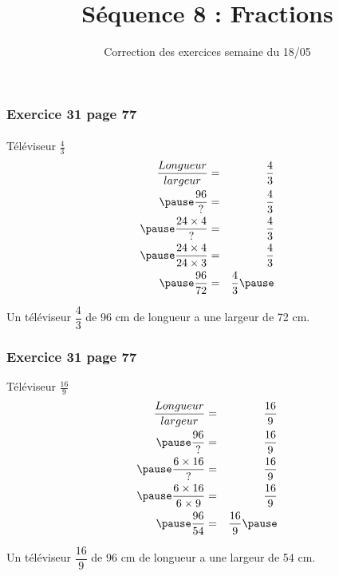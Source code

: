 \documentclass[xcolor={dvipsnames}]{beamer}
\title{Séquence 8 : Fractions}
\subtitle{Correction des exercices semaine du 18/05}
\begin{document}
\begin{frame}
  \titlepage 
\end{frame}

	

\begin{frame}
	\frametitle{Exercice 31 page 77}
	\framesubtitle{}
	

	
	\begin{block}{{\centering Téléviseur $\frac{4}{3}$}}
		\pause
		\begin{eqnarray*}
			\dfrac{Longueur}{largeur} &= & \dfrac{4}{3} \\ \pause
			\dfrac{96}{?} &= & \dfrac{4}{3} \\ \pause
			\dfrac{24 \times 4}{?} &= & \dfrac{4}{3} \\ \pause
			\dfrac{24 \times 4}{24 \times 3} &= & \dfrac{4}{3} \\ \pause
			\dfrac{96}{72} &= & \dfrac{4}{3}  \pause
		\end{eqnarray*}
		
		Un téléviseur $\dfrac{4}{3}$ de 96 cm de longueur a une largeur de 72 cm. 
	\end{block}


	
\end{frame}


\begin{frame}
	\frametitle{Exercice 31 page 77}

	
	
	\begin{block}{Téléviseur $\frac{16}{9}$}
		\pause
		\begin{eqnarray*}
			\dfrac{Longueur}{largeur} &= & \dfrac{16}{9} \\ \pause
			\dfrac{96}{?} &= & \dfrac{16}{9} \\ \pause
			\dfrac{6 \times 16}{?} &= & \dfrac{16}{9} \\ \pause
			\dfrac{6 \times 16}{6 \times 9} &= & \dfrac{16}{9} \\ \pause
			\dfrac{96}{54} &= & \dfrac{16}{9}  \pause
		\end{eqnarray*}
		
		Un téléviseur $\dfrac{16}{9}$ de 96 cm de longueur a une largeur de 54 cm. 
	\end{block}
	
	
\end{frame}
\end{document}
